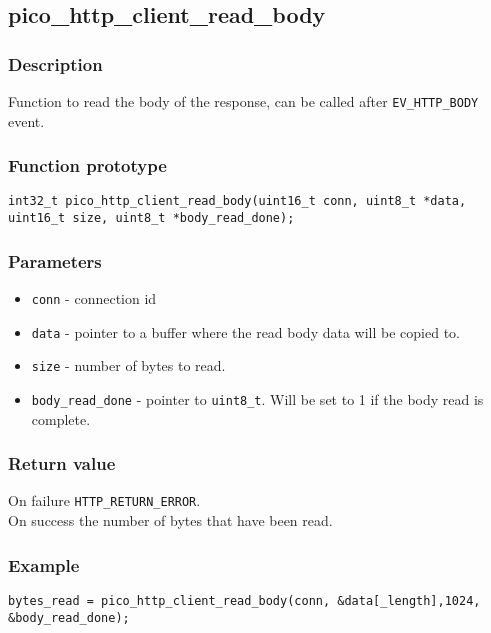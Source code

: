 
\subsection{pico\_http\_client\_read\_body}

\subsubsection*{Description}
Function to read the body of the response, can be called after \texttt{EV\_HTTP\_BODY} event.

\subsubsection*{Function prototype}
\texttt{int32\_t pico\_http\_client\_read\_body(uint16\_t conn, uint8\_t *data, uint16\_t size, uint8\_t *body\_read\_done);}

\subsubsection*{Parameters}
\begin{itemize}[noitemsep]
\item \texttt{conn} - connection id
\item \texttt{data} - pointer to a buffer where the read body data will be copied to.
\item \texttt{size} - number of bytes to read.
\item \texttt{body\_read\_done} - pointer to \texttt{uint8\_t}. Will be set to 1 if the body read is complete.
\end{itemize}
\subsubsection*{Return value}
On failure \texttt{HTTP\_RETURN\_ERROR}.
\\On success the number of bytes that have been read.
\subsubsection*{Example}
\begin{verbatim}
bytes_read = pico_http_client_read_body(conn, &data[_length],1024, &body_read_done);
\end{verbatim}
